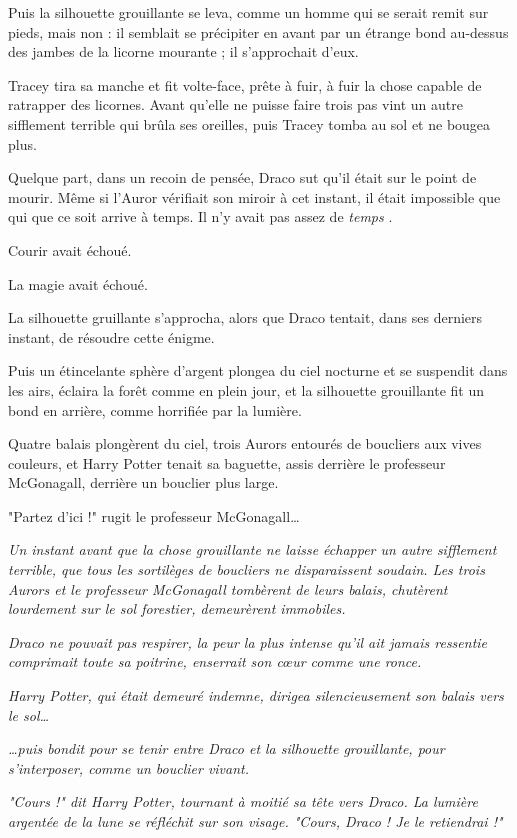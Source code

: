 Puis la silhouette grouillante se leva, comme un homme qui se serait remit sur pieds, mais non : il semblait se précipiter en avant par un étrange bond au-dessus des jambes de la licorne mourante ; il s'approchait d'eux.

Tracey tira sa manche et fit volte-face, prête à fuir, à fuir la chose capable de ratrapper des licornes. Avant qu'elle ne puisse faire trois pas vint un autre sifflement terrible qui brûla ses oreilles, puis Tracey tomba au sol et ne bougea plus.

Quelque part, dans un recoin de pensée, Draco sut qu'il était sur le point de mourir. Même si l'Auror vérifiait son miroir à cet instant, il était impossible que qui que ce soit arrive à temps. Il n'y avait pas assez de \emph{temps} .

Courir avait échoué.

La magie avait échoué.

La silhouette gruillante s'approcha, alors que Draco tentait, dans ses derniers instant, de résoudre cette énigme.

Puis un étincelante sphère d'argent plongea du ciel nocturne et se suspendit dans les airs, éclaira la forêt comme en plein jour, et la silhouette grouillante fit un bond en arrière, comme horrifiée par la lumière.

Quatre balais plongèrent du ciel, trois Aurors entourés de boucliers aux vives couleurs, et Harry Potter tenait sa baguette, assis derrière le professeur McGonagall, derrière un bouclier plus large.

"Partez d'ici !" rugit le professeur McGonagall…

\emph{Un instant avant que la chose grouillante ne laisse échapper un autre sifflement terrible, que tous les sortilèges de boucliers ne disparaissent soudain. Les trois Aurors et le professeur McGonagall tombèrent de leurs balais, chutèrent lourdement sur le sol forestier, demeurèrent immobiles.} 

\emph{Draco ne pouvait pas respirer, la peur la plus intense qu'il ait jamais ressentie comprimait toute sa poitrine, enserrait son cœur comme une ronce.} 

\emph{Harry Potter, qui était demeuré indemne, dirigea silencieusement son balais vers le sol…} 

\emph{…puis bondit pour se tenir entre Draco et la silhouette grouillante, pour s'interposer, comme un bouclier vivant.} 

\emph{"Cours !" dit Harry Potter, tournant à moitié sa tête vers Draco. La lumière argentée de la lune se réfléchit sur son visage. "Cours, Draco ! Je le retiendrai !"} 

